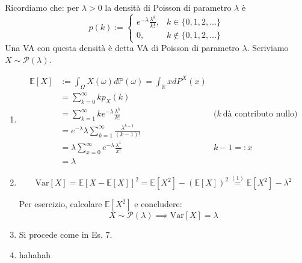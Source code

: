Ricordiamo che: per $\lambda  >0$ la densità di Poisson di parametro $\lambda $ è
\begin{equation*}
p( k) :=\begin{cases}
e^{-\lambda }\frac{\lambda ^{k}}{k!} , & k\in \{0,1,2,\dotsc \}\\
0, & k\notin \{0,1,2,\dotsc \}
\end{cases}
\end{equation*}
Una VA con questa densità è detta VA di Poisson di parametro $\lambda $. Scriviamo $X\sim \mathcal{P}( \lambda )$.
\begin{enumerate}
\item \begin{equation*}
\begin{aligned}
\mathbb{E}[ X] & :=\int _{\Omega } X( \omega ) d\mathbb{P}( \omega ) =\int _{\mathbb{R}} xdP^{X}( x) & \\
 & =\sum\limits _{k=0}^{\infty } kp_{X}( k) & \\
 & =\sum\limits _{k=1}^{\infty } ke^{-\lambda }\frac{\lambda ^{k}}{k!} & \text{(} k\ \text{dà contributo nullo)}\\
 & =e^{-\lambda } \lambda \sum\limits _{k=1}^{\infty }\frac{\lambda ^{k-1}}{( k-1) !} & \\
 & =\lambda \sum\limits _{x=0}^{\infty } e^{-\lambda }\frac{\lambda ^{x}}{x!} & k-1=:x\\
 & =\lambda  & 
\end{aligned}
\end{equation*}
\item \begin{equation*}
\mathrm{Var}[ X] =\mathbb{E}[ X-\mathbb{E}[ X]]^{2} =\mathbb{E}\left[ X^{2}\right] -(\mathbb{E}[ X])^{2}\overset{( 1)}{=}\mathbb{E}\left[ X^{2}\right] -\lambda ^{2}
\end{equation*}

Per esercizio, calcolare $\mathbb{E}\left[ X^{2}\right]$ e concludere:\begin{equation*}
X\sim \mathcal{P}( \lambda ) \implies \mathrm{Var}[ X] =\lambda 
\end{equation*}
\item Si procede come in Es. 7.
\item hahahah
\end{enumerate}

